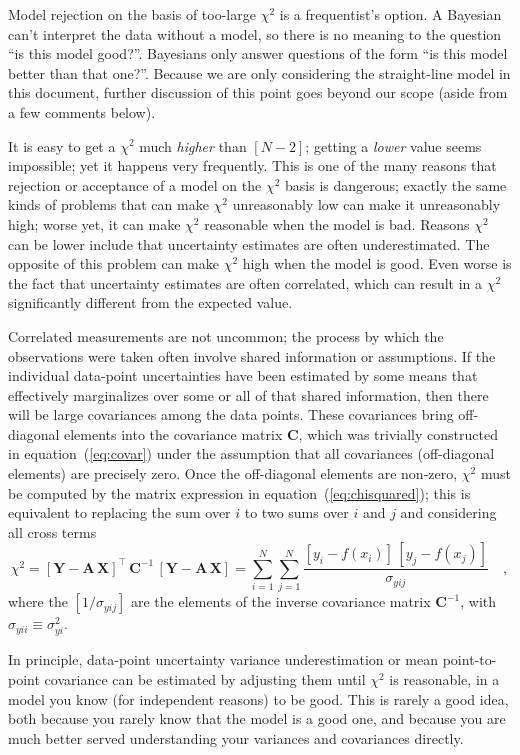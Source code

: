 \documentclass[12pt,twoside]{article}
\newcommand{\documentname}{document}
\newcommand{\equationname}{equation}
\newcounter{problem}
\newcommand{\mmatrix}[1]{\boldsymbol{#1}}
\newcommand{\inverse}[1]{{#1}^{-1}}
\newcommand{\transpose}[1]{{#1}^{\scriptscriptstyle \top}}
\newcommand{\mA}{\mmatrix{A}}
\newcommand{\mC}{\mmatrix{C}}
\newcommand{\mCinv}{\inverse{\mC}}
\newcommand{\mX}{\mmatrix{X}}
\newcommand{\mY}{\mmatrix{Y}}
\begin{document}
Model rejection on the basis of too-large $\chi^2$ is a frequentist's
option.  A Bayesian can't interpret the data without a model, so there
is no meaning to the question ``is this model good?''.  Bayesians only
answer questions of the form ``is this model better than that one?''.
Because we are only considering the straight-line model in this
\documentname, further discussion of this point goes beyond our scope
(aside from a few comments below).

It is easy to get a $\chi^2$ much \emph{higher} than $[N-2]$; getting
a \emph{lower} value seems impossible; yet it happens very frequently.
This is one of the many reasons that rejection or acceptance of a
model on the $\chi^2$ basis is dangerous; exactly the same kinds of
problems that can make $\chi^2$ unreasonably low can make it
unreasonably high; worse yet, it can make $\chi^2$ reasonable when the
model is bad.  Reasons $\chi^2$ can be lower include that uncertainty
estimates are often underestimated. The opposite of this problem can
make $\chi^2$ high when the model is good. Even worse is the fact that
uncertainty estimates are often correlated, which can result in a
$\chi^2$ significantly different from the expected value.

Correlated measurements are not uncommon; the process by which the
observations were taken often involve shared information or
assumptions. If the individual data-point uncertainties have been
estimated by some means that effectively marginalizes over some or all
of that shared information, then there will be large covariances among
the data points.  These covariances bring off-diagonal elements into
the covariance matrix $\mC$, which was trivially constructed in
\equationname~(\ref{eq:covar}) under the assumption that all
covariances (off-diagonal elements) are precisely zero.  Once the
off-diagonal elements are non-zero, $\chi^2$ must be computed by the
matrix expression in \equationname~(\ref{eq:chisquared}); this is
equivalent to replacing the sum over $i$ to two sums over $i$ and $j$
and considering all cross terms
\begin{equation}
\chi^2 =
 \transpose{\left[\mY-\mA\,\mX\right]}\,\mCinv\,\left[\mY-\mA\,\mX\right]
 = \sum_{i=1}^N \sum_{j=1}^N
 \frac{\left[y_i-f(x_i)\right]\,[y_j-f(x_j)]}
 {\sigma_{yij}} \quad,
\end{equation} 
where the $[1/\sigma_{yij}]$ are the elements of the inverse covariance
matrix $\inverse{\mC}$, with $\sigma_{yii}\equiv\sigma_{yi}^2$.

In principle, data-point uncertainty variance underestimation or mean
point-to-point covariance can be estimated by adjusting them until
$\chi^2$ is reasonable, in a model you know (for independent reasons)
to be good.  This is rarely a good idea, both because you rarely know
that the model is a good one, and because you are much better served
understanding your variances and covariances directly.
\end{document}

